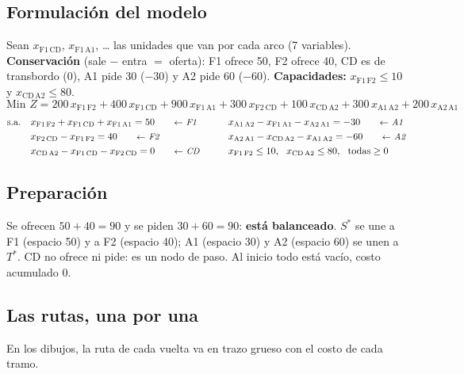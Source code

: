 \documentclass[11pt,a4paper]{article}
\newcommand{\Sini}{\ensuremath{S^{*}}}
\newcommand{\Tfin}{\ensuremath{T^{*}}}
\newcommand{\x}[2]{x_{\mathrm{#1}\,\mathrm{#2}}}
\begin{document}
\subsection*{Formulación del modelo}
Sean $\x{F1}{CD}$, $\x{F1}{A1}$, \dots{} las unidades que van por cada arco (7 variables). \textbf{Conservación}
(sale $-$ entra $=$ oferta): F1 ofrece 50, F2 ofrece 40, CD es de transbordo (0), A1 pide 30 ($-30$) y A2 pide 60
($-60$). \textbf{Capacidades:} $\x{F1}{F2} \le 10$ y $\x{CD}{A2} \le 80$.
\[
\text{Min } Z = 200\,\x{F1}{F2} + 400\,\x{F1}{CD} + 900\,\x{F1}{A1} + 300\,\x{F2}{CD} + 100\,\x{CD}{A2}
                  + 300\,\x{A1}{A2} + 200\,\x{A2}{A1}
\]
\[
\begin{aligned}
\text{s.a.}\quad & \x{F1}{F2} + \x{F1}{CD} + \x{F1}{A1} = 50 \nota{F1} &\qquad& \x{A1}{A2} - \x{F1}{A1} - \x{A2}{A1} = -30 \nota{A1}\\
& \x{F2}{CD} - \x{F1}{F2} = 40 \nota{F2} && \x{A2}{A1} - \x{CD}{A2} - \x{A1}{A2} = -60 \nota{A2}\\
& \x{CD}{A2} - \x{F1}{CD} - \x{F2}{CD} = 0 \nota{CD} && \x{F1}{F2} \le 10, \ \ \x{CD}{A2} \le 80, \ \ \text{todas} \ge 0
\end{aligned}
\]

\subsection*{Preparación}
Se ofrecen $50 + 40 = 90$ y se piden $30 + 60 = 90$: \textbf{está balanceado}. \Sini{} se une a F1 (espacio 50) y a
F2 (espacio 40); A1 (espacio 30) y A2 (espacio 60) se unen a \Tfin. CD no ofrece ni pide: es un nodo de paso. Al inicio
todo está vacío, costo acumulado 0.

\subsection*{Las rutas, una por una}
En los dibujos, la ruta de cada vuelta va en trazo grueso con el costo de cada tramo.

\newcommand{\nodosDU}{%
  \node[fuente, font=\scriptsize\bfseries] (F1) at (0,0.4) {F1};
  \node[fuente, font=\scriptsize\bfseries] (F2) at (0,3.2) {F2};
  \node[nodo, font=\scriptsize\bfseries] (CD) at (2,1.8) {CD};
  \node[sumidero, font=\scriptsize\bfseries] (A1) at (4,0.4) {A1};
  \node[sumidero, font=\scriptsize\bfseries] (A2) at (4,3.2) {A2};}
\newcommand{\grisDU}{%
  \draw[gris] (F1) -- (F2); \draw[gris] (F1) -- (CD); \draw[gris] (F1) -- (A1); \draw[gris] (F2) -- (CD);
  \draw[gris] (CD) -- (A2); \draw[gris] (A1) to[bend left=22] (A2); \draw[gris] (A2) to[bend left=22] (A1);}
\end{document}
